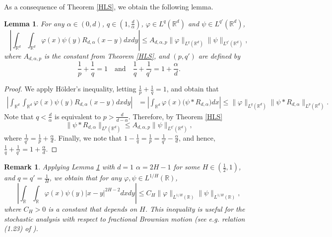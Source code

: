 \documentclass[12pt]{article}
\newtheorem{lemma}[theorem]{Lemma}
\newtheorem{remark}[theorem]{Remark}
\def\bR{\mathbb{R}}
\begin{document}
As a consequence of Theorem \ref{HLS}, we obtain the following lemma.

\begin{lemma}
\label{Hol-HLS}
For any $\alpha \in (0,d)$, $q \in (1,\frac{d}{\alpha})$, $\varphi \in L^q(\bR^d)$ and $\psi \in L^{q'}(\bR^d)$,
\[
\left|\int_{\bR^d}\int_{\bR^d}\varphi(x)\psi(y) R_{d,\alpha}(x-y) dxdy \right| \leq A_{d,\alpha,p} \|\varphi\|_{L^q(\bR^d)} \|\psi\|_{L^{q'}(\bR^d)},
\]
where $A_{d,\alpha,p}$ is the constant  from Theorem \ref{HLS}, and $(p,q')$ are defined by
\[
\frac{1}{p}+\frac{1}{q}=1 \quad \mbox{and} \quad \frac{1}{q}+\frac{1}{q'}=1+\frac{\alpha}{d}.
\]
\end{lemma}

\begin{proof}
We apply H\"older's inequality, letting $\frac{1}{p}+\frac{1}{q}=1$, and obtain that
\begin{align*}
\left|\int_{\bR^d}\int_{\bR^d}\varphi(x)\psi(y) R_{d,\alpha}(x-y) dxdy \right|
& =\left| \int_{\bR^d}\varphi(x) \big(\psi * R_{d,\alpha} \big) dx\right| \leq \|\varphi\|_{L^q(\bR^d)} \|\psi * R_{d,\alpha}\|_{L^p(\bR^d)}.
\end{align*}
Note that $q<\frac{d}{\alpha}$ is equivalent to $p>\frac{d}{d-\alpha}$.
Therefore, by Theorem \ref{HLS} 
\[
 \|\psi * R_{d,\alpha}\|_{L^p(\bR^d)} \leq A_{d,\alpha,p}  \|\psi \|_{L^{q'}(\bR^d)},
\]
where $\frac{1}{q'}=\frac{1}{p}+\frac{\alpha}{d}$. Finally, we note that $
1-\frac{1}{q}=\frac{1}{p}=\frac{1}{q'}-\frac{\alpha}{d}$, and hence, $\frac{1}{q}+\frac{1}{q'}=1+\frac{\alpha}{d}$.

\end{proof}

\begin{remark}
{\rm Applying Lemma \ref{Hol-HLS} with $d=1$ $\alpha=2H-1$ for some $H \in (\frac{1}{2},1)$, and  $q=q'=\frac{1}{H}$, we obtain that for any $\varphi,\psi \in L^{1/H}(\bR)$,
\[
\left|\int_{\bR}\int_{\bR}\varphi(x)\psi(y)|x-y|^{2H-2} dxdy \right| \leq C_{H} \|\varphi\|_{L^{1/H}(\bR)} \|\psi\|_{L^{1/H}(\bR)},
\]
where $C_H>0$ is a constant that depends on $H$. This inequality is useful for the stochastic analysis with respect to fractional Brownian motion (see e.g. relation (1.23) of \cite{nualart03}).
}
\end{remark}
\end{document}
